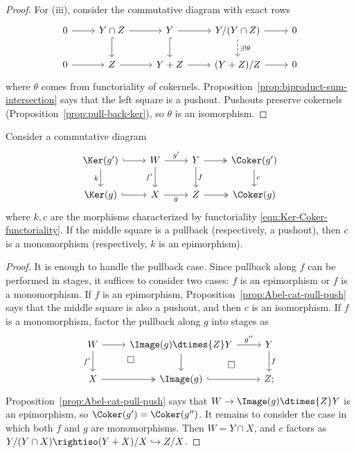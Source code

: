 \begin{proof}
	For (iii), consider the commutative diagram with exact rows
	\[\begin{tikzcd}
		0 \arrow[r] & Y \cap Z \arrow[r] \arrow[hookrightarrow, d] & Y \arrow[hookrightarrow, d] \arrow[r] & Y/(Y \cap Z) \arrow[r] \arrow[dashed, d, "\exists! \theta"] & 0 \\
		0 \arrow[r] & Z \arrow[r] & Y+Z \arrow[r] & (Y+Z)/Z \arrow[r] & 0
	\end{tikzcd}\]
	where $\theta$ comes from functoriality of cokernels.
	Proposition~\ref{prop:biproduct-sum-intersection} says that the left square
	is a pushout. Pushouts preserve cokernels
	(Proposition~\ref{prop:pull-back-ker}), so $\theta$ is an isomorphism.
\end{proof}

\begin{corollary}\label{prop:Abel-cat-Coker-pull}
	Consider a commutative diagram
	\[\begin{tikzcd}
		\Ker(g') \arrow[hookrightarrow, r] \arrow[d, "k"'] & W \arrow[r, "{g'}"] \arrow[d, "{f'}"'] & Y \arrow[d, "f"] \arrow[twoheadrightarrow, r] & \Coker(g') \arrow[d, "c"] \\
		\Ker(g) \arrow[hookrightarrow, r] & X \arrow[r, "g"'] & Z \arrow[twoheadrightarrow, r] & \Coker(g)
	\end{tikzcd}\]
	where $k,c$ are the morphisms characterized by functoriality
	\eqref{eqn:Ker-Coker-functoriality}. If the middle square is a pullback
	(respectively, a pushout), then $c$ is a monomorphism (respectively, $k$ is
	an epimorphism).
\end{corollary}
\begin{proof}
	It is enough to handle the pullback case. Since pullback along $f$ can be
	performed in stages, it suffices to consider two cases: $f$ is an
	epimorphism or $f$ is a monomorphism. If $f$ is an epimorphism,
	Proposition~\ref{prop:Abel-cat-pull-push} says that the middle square is
	also a pushout, and then $c$ is an isomorphism. If $f$ is a monomorphism,
	factor the pullback along $g$ into stages as
	\[\begin{tikzcd}
		W \arrow[d, "{f'}"'] \arrow[r] & \Image(g) \dtimes{Z} Y \arrow[r, "{g''}"] \arrow[d] & Y \arrow[d, "f"] \\
		X \arrow[twoheadrightarrow, r] & \Image(g) \arrow[hookrightarrow, r] \arrow[phantom, lu, "\Box" description] & Z ; \arrow[phantom, lu, "\Box" description]
	\end{tikzcd}\]
	Proposition~\ref{prop:Abel-cat-pull-push} says that
	$W\to\Image(g)\dtimes{Z}Y$ is an epimorphism, so
	$\Coker(g')=\Coker(g'')$. It remains to consider the case in which both
	$f$ and $g$ are monomorphisms. Then $W=Y\cap X$, and $c$ factors as
	$Y/(Y\cap X)\rightiso(Y+X)/X\hookrightarrow Z/X$.
\end{proof}

